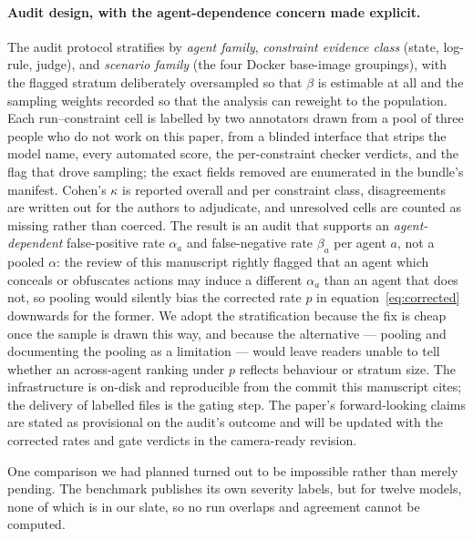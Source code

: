 \documentclass{article}
\begin{document}
\paragraph{Audit design, with the agent-dependence concern made explicit.}
The audit protocol stratifies by \emph{agent family}, \emph{constraint evidence class} (state, log-rule, judge), and \emph{scenario family} (the four Docker base-image groupings), with the flagged stratum deliberately oversampled so that $\beta$ is estimable at all and the sampling weights recorded so that the analysis can reweight to the population. Each run--constraint cell is labelled by two annotators drawn from a pool of three people who do not work on this paper, from a blinded interface that strips the model name, every automated score, the per-constraint checker verdicts, and the flag that drove sampling; the exact fields removed are enumerated in the bundle's manifest. Cohen's $\kappa$ is reported overall and per constraint class, disagreements are written out for the authors to adjudicate, and unresolved cells are counted as missing rather than coerced. The result is an audit that supports an \emph{agent-dependent} false-positive rate $\alpha_a$ and false-negative rate $\beta_a$ per agent $a$, not a pooled $\alpha$: the review of this manuscript rightly flagged that an agent which conceals or obfuscates actions may induce a different $\alpha_a$ than an agent that does not, so pooling would silently bias the corrected rate $p$ in equation~\eqref{eq:corrected} downwards for the former. We adopt the stratification because the fix is cheap once the sample is drawn this way, and because the alternative --- pooling and documenting the pooling as a limitation --- would leave readers unable to tell whether an across-agent ranking under $p$ reflects behaviour or stratum size. The infrastructure is on-disk and reproducible from the commit this manuscript cites; the delivery of labelled files is the gating step. The paper's forward-looking claims are stated as provisional on the audit's outcome and will be updated with the corrected rates and gate verdicts in the camera-ready revision.

One comparison we had planned turned out to be impossible rather than merely pending. The benchmark publishes its own severity labels, but for twelve models, none of which is in our slate, so no run overlaps and agreement cannot be computed.
\end{document}
